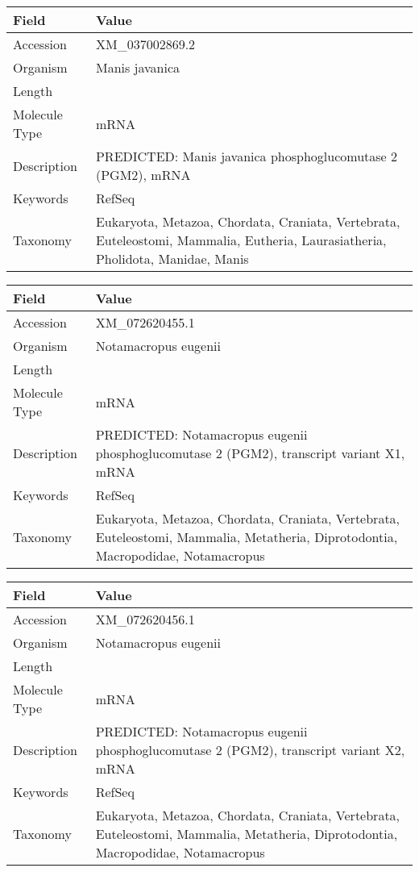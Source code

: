 \documentclass[10pt]{article}
\begin{document}
\vspace{1em}
{\footnotesize
\begin{longtable}{>{\raggedright\arraybackslash}p{4.5cm} >{\raggedright\arraybackslash}p{11.5cm}}
\textbf{Field} & \textbf{Value} \\
\hline
Accession & XM\_037002869.2 \\
Organism & Manis javanica \\
Length & 2769 \\
Molecule Type & mRNA \\
Description & PREDICTED: Manis javanica phosphoglucomutase 2 (PGM2), mRNA \\
Keywords & RefSeq \\
Taxonomy & Eukaryota, Metazoa, Chordata, Craniata, Vertebrata, Euteleostomi, Mammalia, Eutheria, Laurasiatheria, Pholidota, Manidae, Manis \\
\end{longtable}
}

\vspace{1em}
{\footnotesize
\begin{longtable}{>{\raggedright\arraybackslash}p{4.5cm} >{\raggedright\arraybackslash}p{11.5cm}}
\textbf{Field} & \textbf{Value} \\
\hline
Accession & XM\_072620455.1 \\
Organism & Notamacropus eugenii \\
Length & 2796 \\
Molecule Type & mRNA \\
Description & PREDICTED: Notamacropus eugenii phosphoglucomutase 2 (PGM2), transcript variant X1, mRNA \\
Keywords & RefSeq \\
Taxonomy & Eukaryota, Metazoa, Chordata, Craniata, Vertebrata, Euteleostomi, Mammalia, Metatheria, Diprotodontia, Macropodidae, Notamacropus \\
\end{longtable}
}

\vspace{1em}
{\footnotesize
\begin{longtable}{>{\raggedright\arraybackslash}p{4.5cm} >{\raggedright\arraybackslash}p{11.5cm}}
\textbf{Field} & \textbf{Value} \\
\hline
Accession & XM\_072620456.1 \\
Organism & Notamacropus eugenii \\
Length & 2899 \\
Molecule Type & mRNA \\
Description & PREDICTED: Notamacropus eugenii phosphoglucomutase 2 (PGM2), transcript variant X2, mRNA \\
Keywords & RefSeq \\
Taxonomy & Eukaryota, Metazoa, Chordata, Craniata, Vertebrata, Euteleostomi, Mammalia, Metatheria, Diprotodontia, Macropodidae, Notamacropus \\
\end{longtable}
}
\end{document}
